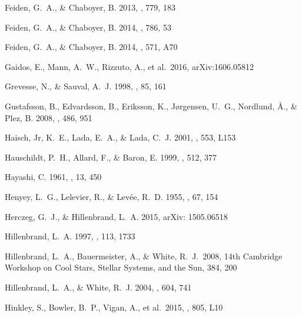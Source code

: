 \begin{thebibliography}{56}
{Feiden}, G.~A., \& {Chaboyer}, B. 2013, \apj, 779, 183

{Feiden}, G.~A., \& {Chaboyer}, B. 2014{}, \apj, 786, 53

{Feiden}, G.~A., \& {Chaboyer}, B. 2014{}, \aap, 571, A70

 Gaidos, E., Mann, A.~W., Rizzuto, A., et al.\ 2016, arXiv:1606.05812 

{Grevesse}, N., \& {Sauval}, A.~J. 1998, \ssr, 85, 161

{Gustafsson}, B., {Edvardsson}, B., {Eriksson}, K., {J{\o}rgensen}, U.~G.,
  {Nordlund}, {\AA}., \& {Plez}, B. 2008, \aap, 486, 951

Haisch, Jr, K.~E., Lada, E.~A., \& Lada, C.~J. 2001, \apj, 553, L153

{Hauschildt}, P.~H., {Allard}, F., \& {Baron}, E. 1999, \apj, 512, 377

{Hayashi}, C. 1961, \pasj, 13, 450

{Henyey}, L.~G., {Lelevier}, R., \& {Lev{\'e}e}, R.~D. 1955, \pasp, 67, 154

{Herczeg}, G.~J., \& {Hillenbrand}, L.~A. 2015, arXiv: 1505.06518

{Hillenbrand}, L.~A. 1997, \aj, 113, 1733

 Hillenbrand, L.~A., Bauermeister, A., \& White, R.~J.\ 2008, 14th Cambridge Workshop on Cool Stars, Stellar Systems, and the Sun, 384, 200 

{Hillenbrand}, L.~A., \& {White}, R.~J. 2004, \apj, 604, 741

 Hinkley, S., Bowler, B.~P., Vigan, A., et al.\ 2015, \apjl, 805, L10 


\end{thebibliography}
